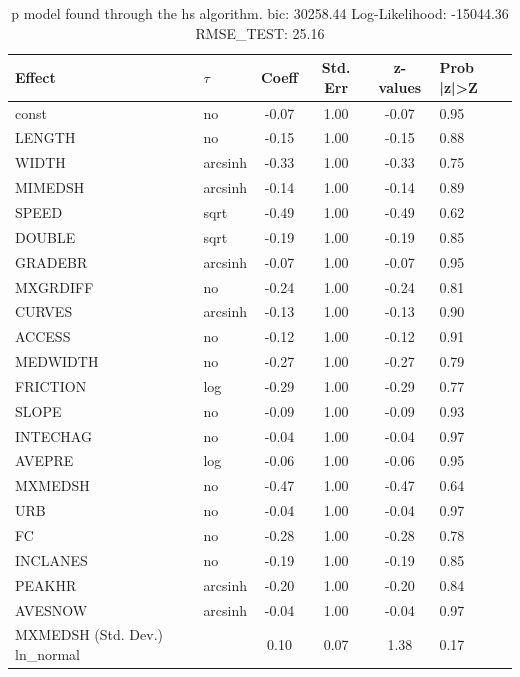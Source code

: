 \begin{table}
	\caption{p model found through the hs algorithm. bic: 30258.44 Log-Likelihood: -15044.36 RMSE_TEST: 25.16}
	\begin{center}
		\begin{tabular}{|l|l|c|c|c|l|}
			\hline
			Effect & $\tau$ & Coeff & Std. Err & z-values & Prob |z|>Z \\
			\hline
			const & no & -0.07 & 1.00 & -0.07 & 0.95 \\
			\hline
			LENGTH & no & -0.15 & 1.00 & -0.15 & 0.88 \\
			\hline
			WIDTH & arcsinh & -0.33 & 1.00 & -0.33 & 0.75 \\
			\hline
			MIMEDSH & arcsinh & -0.14 & 1.00 & -0.14 & 0.89 \\
			\hline
			SPEED & sqrt & -0.49 & 1.00 & -0.49 & 0.62 \\
			\hline
			DOUBLE & sqrt & -0.19 & 1.00 & -0.19 & 0.85 \\
			\hline
			GRADEBR & arcsinh & -0.07 & 1.00 & -0.07 & 0.95 \\
			\hline
			MXGRDIFF & no & -0.24 & 1.00 & -0.24 & 0.81 \\
			\hline
			CURVES & arcsinh & -0.13 & 1.00 & -0.13 & 0.90 \\
			\hline
			ACCESS & no & -0.12 & 1.00 & -0.12 & 0.91 \\
			\hline
			MEDWIDTH & no & -0.27 & 1.00 & -0.27 & 0.79 \\
			\hline
			FRICTION & log & -0.29 & 1.00 & -0.29 & 0.77 \\
			\hline
			SLOPE & no & -0.09 & 1.00 & -0.09 & 0.93 \\
			\hline
			INTECHAG & no & -0.04 & 1.00 & -0.04 & 0.97 \\
			\hline
			AVEPRE & log & -0.06 & 1.00 & -0.06 & 0.95 \\
			\hline
			MXMEDSH & no & -0.47 & 1.00 & -0.47 & 0.64 \\
			\hline
			URB & no & -0.04 & 1.00 & -0.04 & 0.97 \\
			\hline
			FC & no & -0.28 & 1.00 & -0.28 & 0.78 \\
			\hline
			INCLANES & no & -0.19 & 1.00 & -0.19 & 0.85 \\
			\hline
			PEAKHR & arcsinh & -0.20 & 1.00 & -0.20 & 0.84 \\
			\hline
			AVESNOW & arcsinh & -0.04 & 1.00 & -0.04 & 0.97 \\
			\hline
			MXMEDSH (Std. Dev.) ln_normal &  & 0.10 & 0.07 & 1.38 & 0.17 \\

\end{tabular}
\end{center}
\end{table}

